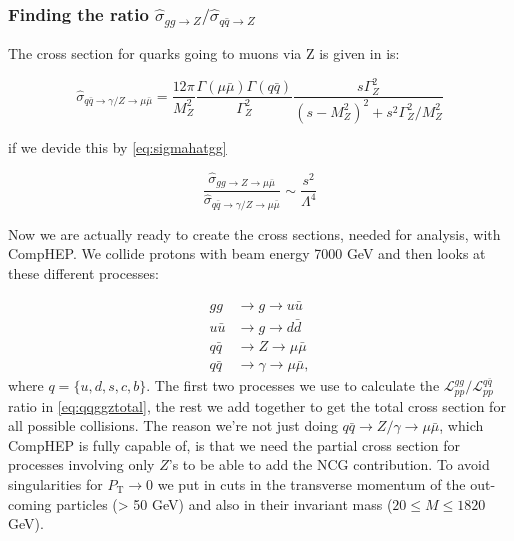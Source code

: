\subsubsection{Finding the ratio ${\hat \sigma_{gg \rightarrow Z}}/{\hat \sigma_{q \bar q \rightarrow Z}}$}
The cross section for quarks going to muons via Z is given in \cite{amsler2008rpp} is:

\begin{equation}
	\hat \sigma_{q \bar q \rightarrow \gamma/ Z \rightarrow \mu \bar \mu} = \frac{12 \pi}{M_{Z}^{2}}\frac{\Gamma(\mu \bar \mu)\Gamma(q\bar q)}{\Gamma^{2}_{Z}}\frac{s\Gamma^{2}_{Z}}{(s-M_{Z}^{2})^{2}+s^{2}\Gamma_{Z}^{2}/M_{Z}^{2}}
	\end{equation}
	
if we devide this by \ref{eq:sigmahatgg}

\begin{equation}
	\frac{\hat \sigma_{gg \rightarrow Z \rightarrow \mu \bar \mu}}{\hat \sigma_{q \bar q \rightarrow \gamma/ Z \rightarrow \mu \bar \mu}} \sim \frac{s^{2}}{\Lambda^{4}}
\end{equation}



Now we are actually ready to create the cross sections, needed for analysis, with CompHEP. We collide protons with beam energy 7000 GeV and then looks at these different processes:

\begin{align}
gg &\rightarrow g \rightarrow u \bar u \nonumber \\ \nonumber
u \bar u &\rightarrow g \rightarrow d \bar d \\ \nonumber
q \bar q &\rightarrow Z \rightarrow \mu \bar \mu \\ \nonumber
q \bar q &\rightarrow \gamma \rightarrow \mu \bar \mu,
\end{align}
where $q = \{u,d,s,c,b\}$. The first two processes we use to calculate the ${\mathcal{L}_{pp}^{gg}}/{\mathcal{L}_{pp}^{q \bar q}}$ ratio in \eqref{eq:qqggztotal}, the rest we add together to get the total cross section for all possible collisions. The reason we're not just doing $q \bar q \rightarrow Z/ \gamma \rightarrow \mu \bar \mu$, which CompHEP is fully capable of, is that we need the partial cross section for processes involving only $Z$'s to be able to add the NCG contribution. To avoid singularities for $P_\textrm{T} \rightarrow 0$ we put in cuts in the transverse momentum of the out-coming particles (> 50 GeV) and also in their invariant mass ($20 \leq M \leq 1820$ GeV).

